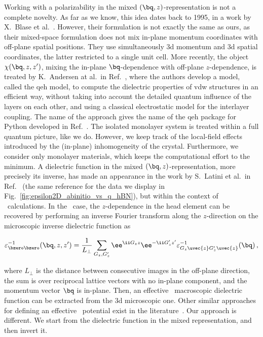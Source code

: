 \noindent Working with a polarizability in the mixed $(\bq,z)$-representation is not a complete novelty.
As far as we know, this idea dates back to 1995, in a work by X.~Blase et al.~\cite{Blase_Rubio_Louie_Cohen_1995}.
However, their formulation is not exactly the same as ours, as their mixed-space formulation does not mix in-plane momentum coordinates with off-plane spatial positions.
They use simultaneously \gls{3d} momentum and \gls{3d} spatial coordinates, the latter restricted to a single unit cell.
More recently, the object $\chi(\bq,z,z')$, mixing the in-plane $\bq$-dependence with off-plane $z$-dependence, is treated by K.~Andersen at al.~in Ref.~\cite{Dielectric_Genome}, where the authors develop a model, called the \gls{qeh} model, to compute the dielectric properties of \gls{vdw} structures in an efficient way, without taking into account the detailed quantum influence of the layers on each other, and using a classical electrostatic model for the interlayer coupling.
The name of the approach gives the name of the \gls{qeh} package for Python developed in Ref.~\cite{Dielectric_Genome}.
The isolated monolayer system is treated within a full quantum picture, like we do.
However, we keep track of the local-field effects introduced by the (in-plane) inhomogeneity of the crystal.
Furthermore, we consider only monolayer materials, which keeps the computational effort to the minimum.
A dielectric function in the mixed $(\bq,z)$-representation, more precisely its inverse, has made an appearance in the work by S.~Latini et al.~in Ref.~\cite{Latini_2015} (the same reference for the data we display in Fig.~\ref{fig:epsilon2D_abinitio_vs_q_hBN}), but within the context of \abinit~calculations.
In the \abinit~case, the $z$-dependence in the head element can be recovered by performing an inverse Fourier transform along the $z$-direction on the microscopic inverse dielectric function as

\begin{equation}
    \label{eq:inverse_dielectric_function_mixed_representation}
    \varepsilon^{-1}_{\bzero \bzero}(\bq,z,z') = \frac{1}{L_{\perp}} \sum_{G_z, G_z'} \ee^{\ii G_z z} \ee^{-\ii G_z' z'} \varepsilon^{-1}_{G_z \uvec{z} G_z' \uvec{z}}(\bq)\,,
\end{equation}

\noindent where $L_{\perp}$ is the distance between consecutive images in the off-plane direction, the sum is over reciprocal lattice vectors with no in-plane component, and the momentum vector $\bq$ is in-plane.
Then, an effective \bd~macroscopic dielectric function can be extracted from the \gls{3d} microscopic one.
Other similar approaches for defining an effective \bd~potential exist in the literature~\cite{Diana_PhD,Jornada_PhD}.
Our approach is different.
We start from the dielectric function in the mixed representation, and then invert it.

